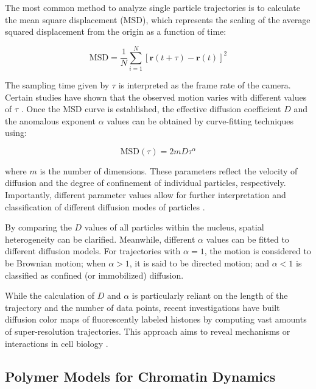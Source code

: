 The most common method to analyze single particle trajectories is to calculate the mean square displacement (MSD), which represents the scaling of the average squared displacement from the origin as a function of time:

\begin{equation}
\text{MSD} = \frac{1}{N} \sum_{i=1}^{N} \left[ \mathbf{r}(t + \tau) - \mathbf{r}(t) \right]^2
\end{equation}

The sampling time given by $\tau$ is interpreted as the frame rate of the camera. Certain studies have shown that the observed motion varies with different values of $\tau$ \parencite{Amitai2017,Shukron2017a}. Once the MSD curve is established, the effective diffusion coefficient $D$ and the anomalous exponent $\alpha$ values can be obtained by curve-fitting techniques using:

\begin{equation}
\text{MSD}(\tau) = 2mD\tau^\alpha
\end{equation}

where $m$ is the number of dimensions. These parameters reflect the velocity of diffusion and the degree of confinement of individual particles, respectively. Importantly, different parameter values allow for further interpretation and classification of different diffusion modes of particles \parencite{Wasim2018,Zhong2020}.

By comparing the $D$ values of all particles within the nucleus, spatial heterogeneity can be clarified. Meanwhile, different $\alpha$ values can be fitted to different diffusion models. For trajectories with $\alpha = 1$, the motion is considered to be Brownian motion; when $\alpha > 1$, it is said to be directed motion; and $\alpha < 1$ is classified as confined (or immobilized) diffusion.

While the calculation of $D$ and $\alpha$ is particularly reliant on the length of the trajectory and the number of data points, recent investigations have built diffusion color maps of fluorescently labeled histones by computing vast amounts of super-resolution trajectories. This approach aims to reveal mechanisms or interactions in cell biology \parencite{Amitai2017,Barth2020,Nozaki2017}.

\subsection{Polymer Models for Chromatin Dynamics}

